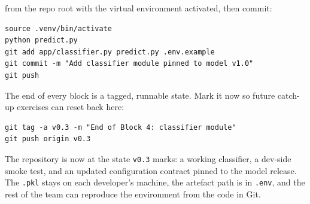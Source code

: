 

 from the repo root with the
virtual environment activated, then commit:

\begin{verbatim}
source .venv/bin/activate
python predict.py
git add app/classifier.py predict.py .env.example
git commit -m "Add classifier module pinned to model v1.0"
git push
\end{verbatim}



The end of every block is a tagged, runnable state. Mark it now so
future catch-up exercises can reset back here:

\begin{verbatim}
git tag -a v0.3 -m "End of Block 4: classifier module"
git push origin v0.3
\end{verbatim}

The repository is now at the state \texttt{v0.3} marks: a working
classifier, a dev-side smoke test, and an updated configuration contract
pinned to the model release.
The \texttt{.pkl} stays on each developer's machine, the artefact path
is in \texttt{.env}, and the rest of the team can reproduce the
environment from the code in Git.




